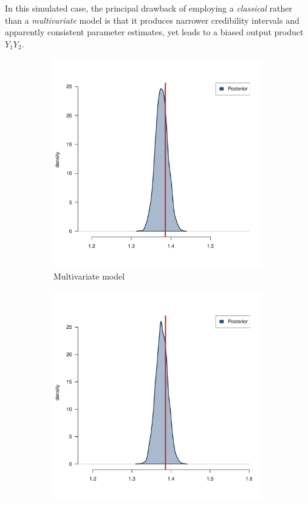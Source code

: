 In this simulated case, the principal drawback of employing a \textit{classical} rather than a \textit{multivariate} model is that it produces narrower credibility intervals and apparently consistent parameter estimates, yet leads to a biased output product \( Y_1 Y_2\).

\begin{figure}[htb]
	\centering
	\begin{subfigure}{0.4\textwidth}
		\includegraphics{./Figures/alpha_corr.pdf}
		\caption{Multivariate model}
		\label{fig:capparatus}
	\end{subfigure}
	\hfil
	\begin{subfigure}{0.4\textwidth}
		\includegraphics{./Figures/alpha_uncorr.pdf}

\end{subfigure}
\end{figure}
